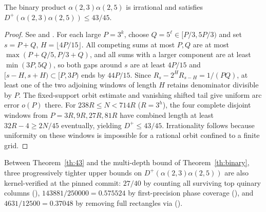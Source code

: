 \documentclass[11pt]{article}
\begin{document}
\begin{theorem}\label{th:43}
The binary product $\alpha(2,3)\alpha(2,5)$ is irrational and satisfies $D^+(\alpha(2,3)\alpha(2,5))\le 43/45$.
\end{theorem}
\begin{proof}
See  and . For each large $P=3^k$, choose $Q=5^\ell\in[P/3,5P/3)$ and set $s=P+Q$, $H=\lfloor4P/15\rfloor$. All competing sums at most $P,Q$ are at most $\max(P+Q/5,P/3+Q)$, and all sums with a larger component are at least $\min(3P,5Q)$, so both gaps around $s$ are at least $4P/15$ and $[s-H,s+H)\subset[P,3P)$ ends by $44P/15$. Since $R_s-2^H R_{s-H}=1/(PQ)$, at least one of the two adjoining windows of length $H$ retains denominator divisible by $P$. The fixed-support orbit estimate and vanishing shifted tail give uniform arc error $o(P)$ there. For $238R\le N<714R$ ($R=3^h$), the four complete disjoint windows from $P=3R,9R,27R,81R$ have combined length at least $32R-4\ge2N/45$ eventually, yielding $D^+\le43/45$. Irrationality follows because uniformity on these windows is impossible for a rational orbit confined to a finite grid.
\end{proof}

\begin{remark}
Between Theorem~\ref{th:43} and the multi-depth bound of Theorem~\ref{th:binary}, three progressively tighter upper bounds on $D^+(\alpha(2,3)\alpha(2,5))$ are also kernel-verified at the pinned commit: $27/40$ by counting all surviving top quinary columns (), $143881/250000=0.575524$ by first-precision phase coverage (), and $4631/12500=0.37048$ by removing full rectangles via  ().
\end{remark}
\end{document}
